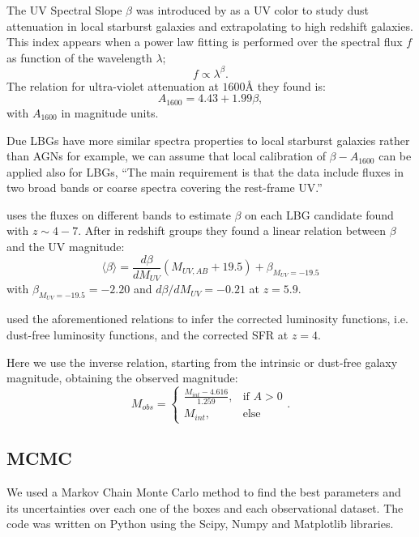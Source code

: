 \documentclass{emulateapj}
\begin{document}
The UV Spectral Slope $\beta$ was introduced by \citet{meurer99} as a UV color to 
study dust attenuation in local starburst galaxies and extrapolating to high redshift galaxies. 
This index appears when a power law fitting is performed over the spectral flux $f$ 
as function of the wavelength $\lambda$;
\[ f \propto \lambda^\beta.\]
The relation for ultra-violet attenuation at $1600 \textrm{\AA}$ they found is:
\begin{equation}
A_{1600} = 4.43 + 1.99 \beta,
\end{equation}
with $A_{1600}$ in magnitude units. 

Due LBGs have more similar spectra properties to local starburst galaxies rather than AGNs 
for example, we can assume that local calibration of $\beta-A_{1600}$ can be applied also 
for LBGs,
``The main requirement is that the data include fluxes in two broad bands or coarse spectra 
covering the rest-frame UV.''


\citet{bouwens12b} uses the fluxes on different bands to estimate $\beta$ on each LBG 
candidate found with $z \sim 4-7$. After in redshift groups they found a linear relation 
between $\beta$ and the UV magnitude:
\begin{equation}
\langle \beta \rangle = \frac{d \beta}{d M_{UV}} \left( M_{UV,AB}+19.5 \right) 
                                   + \beta_{M_{UV}=-19.5}
\end{equation}
with $ \beta_{M_{UV}=-19.5} = -2.20$ and $d \beta/d M_{UV} = -0.21$ at $z=5.9$.

\citet{smit12} used the aforementioned relations to infer the corrected luminosity functions,
i.e. dust-free luminosity functions, and the corrected SFR at $z=4$. 

Here we use the inverse relation, starting from the intrinsic or dust-free galaxy magnitude, 
obtaining the observed magnitude:
\begin{equation}
  M_{obs} = \begin{cases} 
                         \frac{M_{int}-4.616}{1.259}, &\mbox{if } A>0 \\
                         M_{int}, &\mbox{else}
                   \end{cases}.
\label{eqn. dust attenuation}
\end{equation}


\subsection{MCMC}
We used a Markov Chain Monte Carlo method to find the best parameters and its 
uncertainties over each one of the boxes and each observational dataset. The code was written
on Python using the Scipy, Numpy and Matplotlib libraries.
\end{document}
